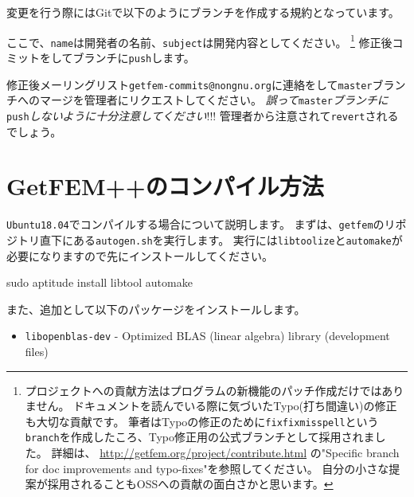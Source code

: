 \documentclass{../../style/ltjoc}
\begin{document}
変更を行う際にはGitで以下のようにブランチを作成する規約となっています。
\begin{shbox}
\end{shbox}
ここで、\texttt{name}は開発者の名前、\texttt{subject}は開発内容としてください。
\footnote{
プロジェクトへの貢献方法はプログラムの新機能のパッチ作成だけではありません。
ドキュメントを読んでいる際に気づいたTypo(打ち間違い)の修正も大切な貢献です。
筆者はTypoの修正のために\texttt{fixfixmisspell}という\texttt{branch}を作成したころ、Typo修正用の公式ブランチとして採用されました。
詳細は、 \href{http://getfem.org/project/contribute.html}{http://getfem.org/project/contribute.html} の"Specific branch for doc improvements and typo-fixes"を参照してください。
自分の小さな提案が採用されることもOSSへの貢献の面白さかと思います。
}
修正後コミットをしてブランチに\texttt{push}します。
\begin{shbox}
\end{shbox}
修正後メーリングリスト\texttt{getfem-commits@nongnu.org}に連絡をして\texttt{master}ブランチへのマージを管理者にリクエストしてください。
\emph{誤って}\texttt{master}\emph{ブランチに}\texttt{push}\emph{しないように十分注意してください}!!!
管理者から注意されて\texttt{revert}されるでしょう。

\section{GetFEM++のコンパイル方法}
\texttt{Ubuntu18.04}でコンパイルする場合について説明します。
まずは、\texttt{getfem}のリポジトリ直下にある\texttt{autogen.sh}を実行します。
実行には\texttt{libtoolize}と\texttt{automake}が必要になりますので先にインストールしてください。
\begin{shbox}
  \shline{} {sudo aptitude install libtool automake}
\end{shbox}
また、追加として以下のパッケージをインストールします。
\begin{itemize}
  \item \texttt{libopenblas-dev} - Optimized BLAS (linear algebra) library (development files)
\end{itemize}
\end{document}
